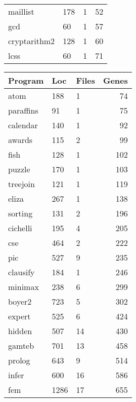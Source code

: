 \begin{table}[!htb]
\begin{minipage}{.5\linewidth}
\begin{tabular}{lllr}
            maillist    &   178 &   1   &   52\\
            gcd         &   60  &   1   &   57\\
            cryptarithm2&   128 &   1   &   60\\
            lcss        &   60  &   1   &   71\\ 
        \end{tabular}
    \end{minipage}%
    \begin{minipage}{.5\linewidth}
      \centering
        \begin{tabular}{lllr}
            \hline
            Program    &   Loc    &   Files   &   Genes\\
            \hline
            atom        &   188 &   1   &   74\\
            paraffins   &   91  &   1   &   75\\
            calendar    &   140 &   1   &   92\\
            awards      &   115 &   2   &   99\\
            fish        &   128 &   1   &   102\\
            puzzle      &   170 &   1   &   103\\
            treejoin    &   121 &   1   &   119\\
            eliza       &   267 &   1   &   138\\
            sorting     &   131 &   2   &   196\\
            cichelli    &   195 &   4   &   205\\
            cse         &   464 &   2   &   222\\
            pic         &   527 &   9   &   235\\
            clausify    &   184 &   1   &   246\\
            minimax     &   238 &   6   &   299\\
            boyer2      &   723 &   5   &   302\\
            expert      &   525 &   6   &   424\\
            hidden      &   507 &   14  &   430\\
            gamteb      &   701 &   13  &   458\\
            prolog      &   643 &   9   &   514\\
            infer       &   600 &   16  &   586\\
            fem         &   1286&   17  &   655\\

\end{tabular}
\end{minipage}
\end{table}

